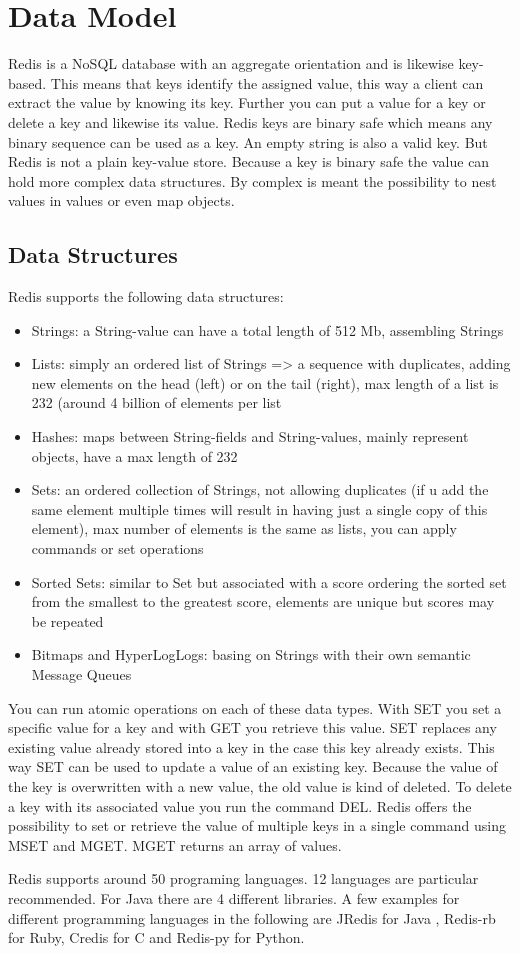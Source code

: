 \chapter{Data Model}

Redis is a NoSQL database with an aggregate orientation and is likewise key-based. This means that keys identify the assigned value, this way a client can extract the value by knowing its key. Further you can put a value for a key or delete a key and likewise its value. Redis keys are binary safe which means any binary sequence can be used as a key. An empty string is also a valid key. But Redis is not a plain key-value store. Because a key is binary safe the value can hold more complex data structures. By complex is meant the possibility to nest values in values or even map objects. 

\section{Data Structures}
Redis supports the following data structures:
\begin{itemize}  
\item Strings: a String-value can have a total length of 512 Mb, assembling Strings
\item Lists: simply an ordered list of Strings => a sequence with duplicates, adding 	new elements on the head (left) or on the tail (right), max length of a list is 232 (around 4 billion of elements per list
\item Hashes: maps between String-fields and String-values, mainly represent objects, have a max length of 232
\item Sets: an ordered collection of Strings, not allowing duplicates (if u add the 	same element multiple times will result in having just a single copy of this element), max number of elements is the same as lists, you can apply commands or set operations
\item Sorted Sets: similar to Set but associated with a score ordering the sorted set from the smallest to the greatest score, elements are unique but scores may be repeated
\item Bitmaps and HyperLogLogs: basing on Strings with their own semantic Message Queues 	
\end{itemize}

You can run atomic operations on each of these data types. With SET you set a specific value for a key and with GET you retrieve this value. SET replaces any existing value already stored into a key in the case this key already exists. This way SET can be used to update a value of an existing key. Because the value of the key is overwritten with a new value, the old value is kind of deleted. To delete a key with its associated value you run the command DEL. Redis offers the possibility to set or retrieve the value of multiple keys in a single command using MSET and MGET. MGET returns an array of values.

Redis supports around 50 programing languages. 12 languages are particular recommended. For Java there are 4 different libraries. A few examples for different programming languages in the following are JRedis for Java , Redis-rb for Ruby, Credis for C and Redis-py for Python.